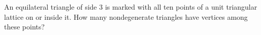 An equilateral triangle of side 3 is marked with all ten points of a unit triangular lattice on or inside it. How many nondegenerate triangles have vertices among these points?
